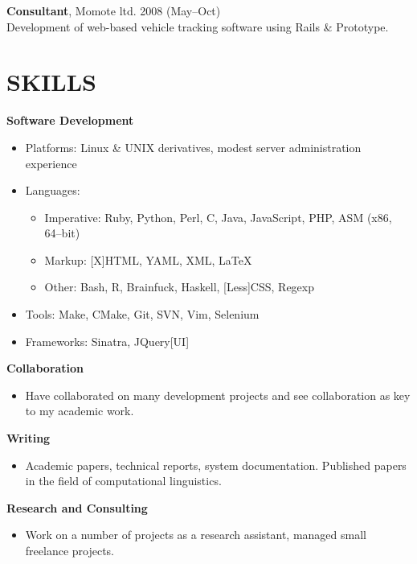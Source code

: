 \documentclass{res}
\begin{document}
\begin{resume}
    {\bf Consultant},
    Momote ltd.
    2008 (May--Oct)\\
    Development of web-based vehicle tracking software using Rails \& Prototype.




\section{SKILLS}
\vspace{0.1in}

   {\bf Software Development}
        \begin{itemize}
            \item[] Platforms: Linux \& UNIX derivatives, modest server administration experience
            \item[] Languages:
                \begin{itemize}
                    \item Imperative: Ruby, Python, Perl, C, Java, JavaScript, PHP, ASM (x86, 64--bit)
                    \item Markup: [X]HTML, YAML, XML, \LaTeX
                    \item Other: Bash, R, Brainfuck, Haskell, [Less]CSS, Regexp
                \end{itemize}
            \item[] Tools: Make, CMake, Git, SVN, Vim, Selenium
            \item[] Frameworks: Sinatra, JQuery[UI]
        \end{itemize}

  {\bf Collaboration}
    \begin{itemize}
      \item[] Have collaborated on many development projects and see collaboration as key to my academic work.
      \end{itemize}

  {\bf Writing}
    \begin{itemize} %
      \item[] Academic papers, technical reports, system documentation.
        Published papers in the field of computational linguistics.
      \end{itemize}


   {\bf  Research and Consulting}
    \begin{itemize}
        \item[] Work on a number of projects as a research assistant, managed small freelance projects.
    \end{itemize}



\end{resume}
\end{document}
